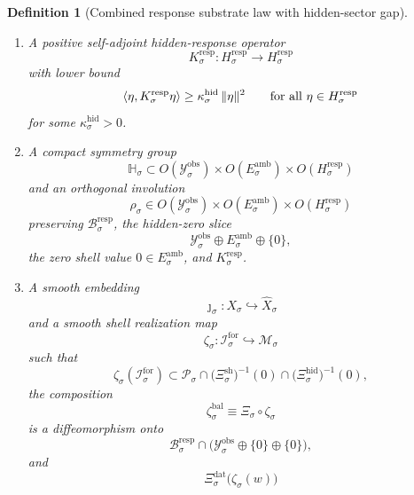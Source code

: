 \documentclass[11pt]{article}
\newcommand{\ForSpace}[1]{\mathcal I_{#1}^{\mathrm{for}}}
\newcommand{\VisibleAffine}[1]{\widehat X_{#1}}
\newcommand{\DataSpace}[1]{\mathcal Y_{#1}^{\mathrm{obs}}}
\newcommand{\AmbientTarget}[1]{E_{#1}^{\mathrm{amb}}}
\newcommand{\BalEmbed}[1]{\zeta_{#1}^{\mathrm{bal}}}
\newcommand{\ProtoSpace}[1]{\mathcal M_{#1}}
\newcommand{\ProtoBody}[1]{\mathcal P_{#1}}
\newcommand{\ResponseMap}[1]{\Xi_{#1}}
\newcommand{\ResponseData}[1]{\Xi_{#1}^{\mathrm{dat}}}
\newcommand{\ResponseShell}[1]{\Xi_{#1}^{\mathrm{sh}}}
\newcommand{\ResponseHidden}[1]{\Xi_{#1}^{\mathrm{hid}}}
\newcommand{\ResponseImage}[1]{\mathcal B_{#1}^{\mathrm{resp}}}
\newcommand{\RespGapSpace}[1]{H_{#1}^{\mathrm{resp}}}
\newcommand{\RespGapBody}[1]{D_{#1}^{\mathrm{resp}}}
\newcommand{\RespHiddenOperator}[1]{K_{#1}^{\mathrm{resp}}}
\newcommand{\ResponseSym}[1]{\mathbb H_{#1}}
\newcommand{\ResponseTime}[1]{\rho_{#1}}
\newcommand{\ProtoEmbed}[1]{\zeta_{#1}}
\newtheorem{definition}{Definition}
\begin{document}
\begin{definition}[Combined response substrate law with hidden-sector gap]
\begin{enumerate}
    \begin{equation}
    (u,e,n)\longmapsto \bigl((u,e,0),n\bigr)
    \label{eq:responsebijection}
    \end{equation}
    is a bijection from \(\ResponseImage{\sigma}\) onto
    \[
    \Bigl(
    \ResponseImage{\sigma}\cap
    \bigl(
    \DataSpace{\sigma}\oplus \AmbientTarget{\sigma}\oplus\{0\}
    \bigr)
    \Bigr)
    \times \RespGapBody{\sigma}.
    \]
    \item A positive self-adjoint hidden-response operator
    \[
    \RespHiddenOperator{\sigma}:\RespGapSpace{\sigma}\to\RespGapSpace{\sigma}
    \]
    with lower bound
    \begin{equation}
    \ev{\eta,\RespHiddenOperator{\sigma}\eta}
    \ge
    \kappa_{\sigma}^{\mathrm{hid}}\,
    \|\eta\|^{2}
    \qquad
    \text{for all }\eta\in\RespGapSpace{\sigma}
    \label{eq:combinedgap}
    \end{equation}
    for some \(\kappa_{\sigma}^{\mathrm{hid}}>0\).
    \item A compact symmetry group
    \[
    \ResponseSym{\sigma}\subset
    O(\DataSpace{\sigma})\times O(\AmbientTarget{\sigma})\times O(\RespGapSpace{\sigma})
    \]
    and an orthogonal involution
    \[
    \ResponseTime{\sigma}\in
    O(\DataSpace{\sigma})\times O(\AmbientTarget{\sigma})\times O(\RespGapSpace{\sigma})
    \]
    preserving \(\ResponseImage{\sigma}\), the hidden-zero slice
    \[
    \DataSpace{\sigma}\oplus \AmbientTarget{\sigma}\oplus\{0\},
    \]
    the zero shell value \(0\in \AmbientTarget{\sigma}\), and \(\RespHiddenOperator{\sigma}\).
    \item A smooth embedding
    \[
    \jmath_{\sigma}:X_{\sigma}\hookrightarrow \VisibleAffine{\sigma}
    \]
    and a smooth shell realization map
    \[
    \ProtoEmbed{\sigma}:\ForSpace{\sigma}\hookrightarrow \ProtoSpace{\sigma}
    \]
    such that
    \[
    \ProtoEmbed{\sigma}(\ForSpace{\sigma})
    \subset
    \ProtoBody{\sigma}\cap
    \bigl(\ResponseShell{\sigma}\bigr)^{-1}(0)\cap
    \bigl(\ResponseHidden{\sigma}\bigr)^{-1}(0),
    \]
    the composition
    \begin{equation}
    \BalEmbed{\sigma}
    \equiv
    \ResponseMap{\sigma}\circ\ProtoEmbed{\sigma}
    \label{eq:ambientembeddef}
    \end{equation}
    is a diffeomorphism onto
    \[
    \ResponseImage{\sigma}\cap
    \bigl(
    \DataSpace{\sigma}\oplus\{0\}\oplus\{0\}
    \bigr),
    \]
    and
    \begin{equation}
    \ResponseData{\sigma}\bigl(\ProtoEmbed{\sigma}(w)\bigr)

\end{equation}
\end{enumerate}
\end{definition}
\end{document}
